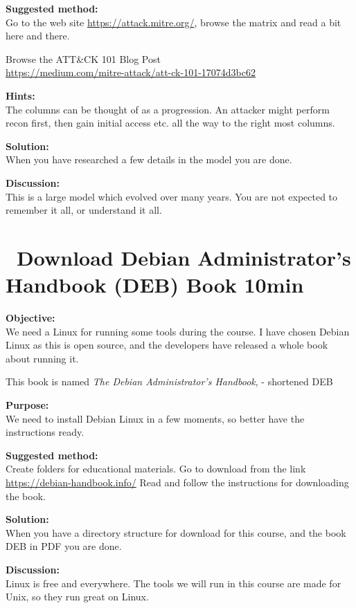 \documentclass[a4paper,11pt,notitlepage]{report}
\begin{document}
{\bf Suggested method:}\\
Go to the web site \url{https://attack.mitre.org/}, browse the matrix and read a bit here and there.

Browse the ATT\&CK 101 Blog Post\\
\url{https://medium.com/mitre-attack/att-ck-101-17074d3bc62}


{\bf Hints:}\\
The columns can be thought of as a progression. An attacker might perform recon first, then gain initial access etc. all the way to the right most columns.

{\bf Solution:}\\
When you have researched a few details in the model you are done.

{\bf Discussion:}\\
This is a large model which evolved over many years. You are not expected to remember it all, or understand it all.


\chapter{\faInfoCircle\ Download Debian Administrator’s Handbook (DEB) Book 10min}
\label{ex:sw-downloadDEB}



{\bf Objective:}\\
We need a Linux for running some tools during the course. I have chosen Debian Linux as this is open source, and the developers have released a whole book about running it.

This book is named
\emph{The Debian Administrator’s Handbook},  - shortened DEB

{\bf Purpose:}\\
We need to install Debian Linux in a few moments, so better have the instructions ready.

{\bf Suggested method:}\\
Create folders for educational materials. Go to download from the link \url{https://debian-handbook.info/}
Read and follow the instructions for downloading the book.

{\bf Solution:}\\
When you have a directory structure for download for this course, and the book DEB in PDF you are done.

{\bf Discussion:}\\
Linux is free and everywhere. The tools we will run in this course are made for Unix, so they run great on Linux.
\end{document}
